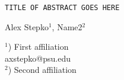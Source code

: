 \documentclass[a4paper]{article}
\begin{document}

\Large
 \begin{center}
\texttt{TITLE OF ABSTRACT GOES HERE}\\ 

\hspace{10pt}

\large
Alex Stepko$^1$, Name2$^2$ \\

\hspace{10pt}

\small  
$^1$) First affiliation\\
axstepko@psu.edu\\
$^2$) Second affiliation

\end{center}


\hspace{10pt}

\normalsize
\blindtext
\end{document}
